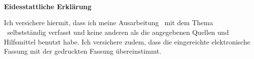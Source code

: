 \thispagestyle{empty}

\AutorVorname\ \AutorNachname\\
\AutorAnschrift\\
\AutorPLZ\ \AutorStadt\
\vspace{2cm}



\begin{center}
\huge{\textbf{Eidesstattliche Erklärung}}
\vspace{2cm}
\end{center}

Ich versichere hiermit, dass ich meine Ausarbeitung \AusarbeitungBezeichnung\ mit dem Thema \grqq \AusarbeitungThema \grqq\ selbstständig verfasst und keine anderen als die angegebenen Quellen und Hilfsmittel benutzt habe.
Ich versichere zudem, dass die eingereichte elektronische Fassung mit der gedruckten Fassung übereinstimmt.

\Unterschrift

\thispagestyle{empty}